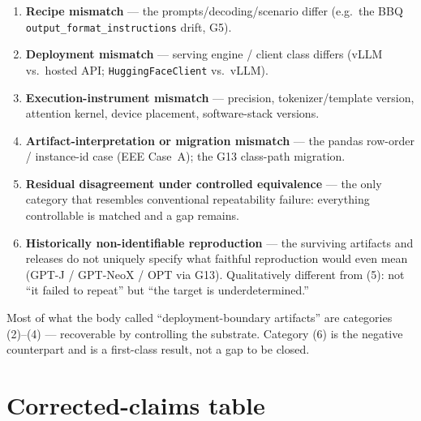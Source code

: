 \documentclass[11pt]{report}
\newcommand{\code}[1]{\texttt{#1}}
\begin{document}
\begin{enumerate}[nosep]
  \item \textbf{Recipe mismatch} --- the prompts/decoding/scenario differ (e.g.\ the
        BBQ \code{output\_format\_instructions} drift, G5).
  \item \textbf{Deployment mismatch} --- serving engine / client class differs (vLLM
        vs.\ hosted API; \code{HuggingFaceClient} vs.\ vLLM).
  \item \textbf{Execution-instrument mismatch} --- precision, tokenizer/template
        version, attention kernel, device placement, software-stack versions.
  \item \textbf{Artifact-interpretation or migration mismatch} --- the pandas
        row-order / instance-id case (EEE Case~A); the G13 class-path migration.
  \item \textbf{Residual disagreement under controlled equivalence} --- the only
        category that resembles conventional repeatability failure: everything
        controllable is matched and a gap remains.
  \item \textbf{Historically non-identifiable reproduction} --- the surviving
        artifacts and releases do not uniquely specify what faithful reproduction
        would even mean (GPT-J / GPT-NeoX / OPT via G13). Qualitatively different from
        (5): not ``it failed to repeat'' but ``the target is underdetermined.''
\end{enumerate}

Most of what the body called ``deployment-boundary artifacts'' are categories
(2)--(4) --- recoverable by controlling the substrate. Category (6) is the negative
counterpart and is a first-class result, not a gap to be closed.

\section{Corrected-claims table}
\end{document}
